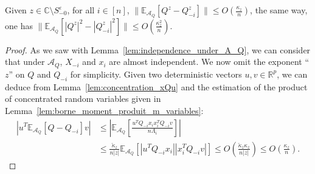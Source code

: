 \documentclass[a4papaer, titlepage]{book}
\begin{document}
\begin{lemma}\label{lem:Q_m_i_proche_Q}
  Given $z \in \mathbb C \setminus S_{-0}^\varepsilon$, for all $i \in [n]$, $\|\mathbb E_{\mathcal A_Q}[Q^z -Q^z_{-i}]\| \leq O(\frac{\kappa_z}{n}  )$, the same way, one has $\|\mathbb E_{\mathcal A_Q}[|Q^z|^2 -|Q^z_{-i}|^2]\| \leq O(\frac{\kappa_z^2}{n}  )$.
\end{lemma}
\begin{proof}
  As we saw with Lemma~\ref{lem:independence_under_A_Q}, we can consider that under $\mathcal A_Q$, $X_{-i}$ and $x_i$ are almost independent. We now omit the exponent ``$z$'' on $Q$ and $Q_{-i}$ for simplicity.
  Given two deterministic vectors $u,v \in \mathbb R^p$, we can deduce from Lemma~\ref{lem:concentration_xQu} and the estimation of the product of concentrated random variables given in Lemma~\ref{lem:borne_moment_produit_m_variables}:
  \begin{align*}
    \left\vert u^T\mathbb E_{\mathcal A_Q}[Q -Q_{-i}]v\right\vert
    &\leq \left\vert \mathbb E_{\mathcal A_Q} \left[\frac{u^TQ_{-i}x_i x_i^TQ_{-i}v}{n\Lambda_i}\right] \right\vert \\
    &\leq \frac{\check \kappa_z}{n|z|}\mathbb E_{\mathcal A_Q} \left[| u^TQ_{-i}x_i | | x_i^TQ_{-i}v |\right]
    \leq O \left( \frac{\check\kappa_z\kappa_z}{n|z|} \right) \leq O \left( \frac{\kappa_z}{n} \right).

\end{align*}
\end{proof}
\end{document}
